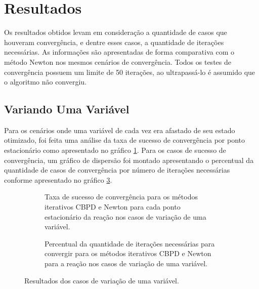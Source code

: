 \section{Resultados}
\label{sec:results}

Os resultados obtidos levam em consideração a quantidade de casos que houveram convergência, e dentre esses casos, a quantidade de iterações necessárias. As informações são apresentadas de forma comparativa com o método Newton nos mesmos cenários de convergência. Todos os testes de convergência possuem um limite de 50 iterações, ao ultrapassá-lo é assumido que o algoritmo não convergiu. 

\subsection{Variando Uma Variável}
\label{sec:res-one-var}

Para os cenários onde uma variável de cada vez era afastado de seu estado otimizado, foi feita uma análise da taxa de sucesso de convergência por ponto estacionário como apresentado no gráfico \ref{fig:result-one-var-conv-tax}. Para os casos de sucesso de convergência, um gráfico de dispersão foi montado apresentando o percentual da quantidade de casos de convergência por número de iterações necessárias conforme apresentado no gráfico \ref{fig:result-one-var-conv-metric}.

\begin{figure}[h]
  \begin{subfigure}{.5\textwidth}
    \begin{center}
      
    \end{center}
    \caption{Taxa de sucesso de convergência para os métodos iterativos CBPD e Newton para cada ponto estacionário da reação  nos casos de variação de uma variável.}
    \label{fig:result-one-var-conv-tax}
  \end{subfigure}\hspace{5mm}%
  \begin{subfigure}{.5\textwidth}
    \begin{center}
      
    \end{center}
    \caption{Percentual da quantidade de iterações necessárias para convergir para os métodos iterativos CBPD e Newton para a reação  nos casos de variação de uma variável.}
    \label{fig:result-one-var-conv-metric}
  \end{subfigure}
  \caption{Resultados dos casos de variação de uma variável.}
\end{figure}

